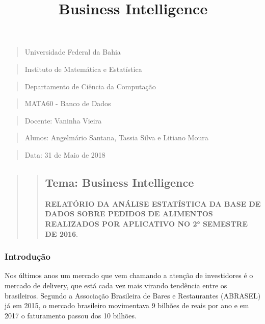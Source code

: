 \documentclass[11pt]{article}
\title{Business Intelligence}
\begin{document}
    
    
    \maketitle
    
    

    
    \begin{quote}
Universidade Federal da Bahia
\end{quote}

\begin{quote}
Instituto de Matemática e Estatística
\end{quote}

\begin{quote}
Departamento de Ciência da Computação
\end{quote}

\begin{quote}
MATA60 - Banco de Dados
\end{quote}

\begin{quote}
Docente: Vaninha Vieira
\end{quote}

\begin{quote}
Alunos: Angelmário Santana, Tassia Silva e Litiano Moura
\end{quote}

\begin{quote}
Data: 31 de Maio de 2018
\end{quote}

\begin{quote}
\begin{quote}
\subsection{Tema: Business
Intelligence}\label{tema-business-intelligence}

\textbf{RELATÓRIO DA ANÁLISE ESTATÍSTICA DA BASE DE DADOS SOBRE PEDIDOS
DE ALIMENTOS REALIZADOS POR APLICATIVO NO 2° SEMESTRE DE 2016}.
\end{quote}
\end{quote}

\subsubsection{Introdução}\label{introduuxe7uxe3o}

Nos últimos anos um mercado que vem chamando a atenção de investidores é
o mercado de delivery, que está cada vez mais virando tendência entre os
brasileiros. Segundo a Associação Brasileira de Bares e Restaurantes
(ABRASEL) já em 2015, o mercado brasileiro movimentava 9 bilhões de
reais por ano e em 2017 o faturamento passou dos 10 bilhões.
\end{document}
